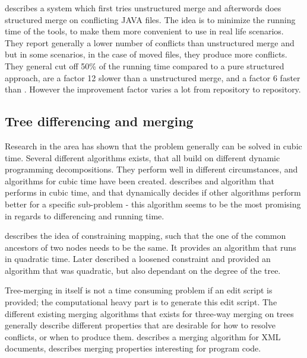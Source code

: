 \documentclass[11pt]{article}
\begin{document}
\citet{Olav} describes a system which first tries unstructured merge and afterwords does structured merge on conflicting JAVA files. The idea is to minimize the running time of the tools, to make them more convenient to use in real life scenarios. They report generally a lower number of conflicts than unstructured merge and \citet{Apel} but in some scenarios, in the case of moved files, they produce more conflicts. They general cut off 50\% of the running time compared to a pure structured approach, are a factor 12 slower than a unstructured merge, and a factor 6 faster than \citet{Apel}. However the improvement factor varies a lot from repository to repository.  

\subsection{Tree differencing and merging}
Research in the area has shown that the problem generally can be solved in cubic time. Several different algorithms exists, that all build on different dynamic programming decompositions. They perform well in different circumstances, and algorithms for cubic time have been created. \citet{Pawlik} describes and algorithm that performs in cubic time, and that dynamically decides if other algorithms perform better for a specific sub-problem - this algorithm seems to be the most promising in regards to differencing and running time.

\citet{Zhang} describes the idea of constraining mapping, such that the one of the common ancestors of two nodes needs to be the same. It provides an algorithm that runs in quadratic time. Later \citet{Lu} described a loosened constraint and provided an algorithm that was quadratic, but also dependant on the degree of the tree.

Tree-merging in itself is not a time consuming problem if an edit script is provided; the computational heavy part is to generate this edit script. The different existing merging algorithms that exists for three-way merging on trees generally describe different properties that are desirable for how to resolve conflicts, or when to produce them. \citet{lindholm} describes a merging algorithm for XML documents, \citet{Horwitz,Asklund,Olav} describes merging properties interesting for program code.

\clearpage
\end{document}
